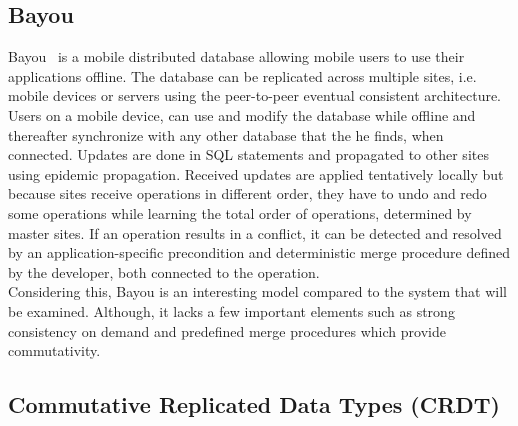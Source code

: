 \documentclass[a4paper,12pt]{report}
\begin{document}
\subsection{Bayou}\label{subsec:Bayou}

Bayou~\cite{Bayou} is a mobile distributed database allowing mobile users to use their applications offline. The database can be replicated across multiple sites, i.e. mobile devices or servers using the peer-to-peer eventual consistent architecture. Users on a mobile device, can use and modify the database while offline and thereafter synchronize with any other database that the he finds, when connected. Updates are done in SQL statements and propagated to other sites using epidemic propagation. Received updates are applied tentatively locally but because sites receive operations in different order, they have to undo and redo some operations while learning the total order of operations, determined by master sites. If an operation results in a conflict, it can be detected and resolved by an application-specific precondition and deterministic merge procedure defined by the developer, both connected to the operation. \\
Considering this, Bayou is an interesting model compared to the system that will be examined. Although, it lacks a few important elements such as strong consistency on demand and predefined merge procedures which provide commutativity.

\subsection{Commutative Replicated Data Types (CRDT)}\label{subsec:CRDT}
\end{document}
